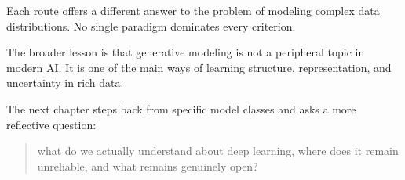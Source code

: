 Each route offers a different answer to the problem of modeling complex data distributions.
No single paradigm dominates every criterion.

\medskip

The broader lesson is that generative modeling is not a peripheral topic in modern AI.
It is one of the main ways of learning structure, representation, and uncertainty in rich data.

\medskip

The next chapter steps back from specific model classes and asks a more reflective question:

\begin{quote}
what do we actually understand about deep learning, where does it remain unreliable, and what remains genuinely open?
\end{quote}